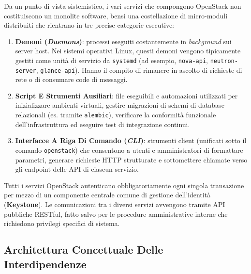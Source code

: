 \documentclass[11pt, a4paper]{article}
\begin{document}
Da un punto di vista sistemistico, i vari servizi che compongono OpenStack non costituiscono un monolite software, bensì una costellazione di micro-moduli distribuiti che rientrano in tre precise categorie esecutive:
\begin{enumerate}
    \item \textbf{Demoni (\emph{Daemons})}: processi eseguiti costantemente in \emph{background} sui server host. Nei sistemi operativi Linux, questi demoni vengono tipicamente gestiti come unità di servizio da \texttt{systemd} (ad esempio, \texttt{nova-api}, \texttt{neutron-server}, \texttt{glance-api}). Hanno il compito di rimanere in ascolto di richieste di rete o di consumare code di messaggi.
    \item \textbf{Script E Strumenti Ausiliari}: file eseguibili e automazioni utilizzati per inizializzare ambienti virtuali, gestire migrazioni di schemi di database relazionali (es. tramite \texttt{alembic}), verificare la conformità funzionale dell'infrastruttura ed eseguire test di integrazione continui.
    \item \textbf{Interfacce A Riga Di Comando (\emph{CLI})}: strumenti client (unificati sotto il comando \texttt{openstack}) che consentono a utenti e amministratori di formattare parametri, generare richieste HTTP strutturate e sottomettere chiamate verso gli endpoint delle API di ciascun servizio.
\end{enumerate}

Tutti i servizi OpenStack autenticano obbligatoriamente ogni singola transazione per mezzo di un componente centrale comune di gestione dell'identità (\textbf{Keystone}). Le comunicazioni tra i diversi servizi avvengono tramite API pubbliche RESTful, fatto salvo per le procedure amministrative interne che richiedono privilegi specifici di sistema.


\subsection{Architettura Concettuale Delle Interdipendenze}
\end{document}
